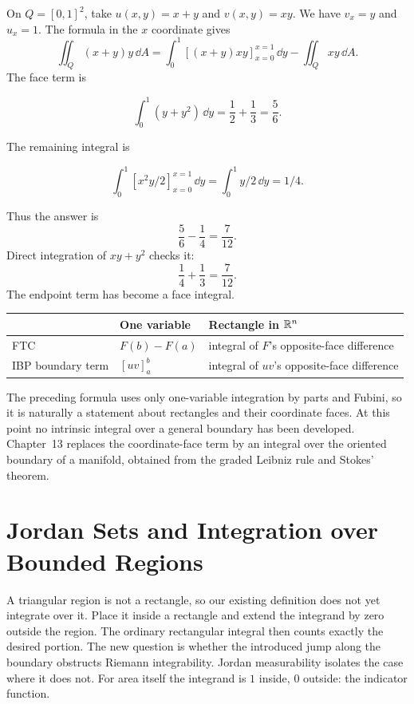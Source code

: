 \begin{example}
On $Q=[0,1]^2$, take $u(x,y)=x+y$ and $v(x,y)=xy$.
We have $v_x=y$ and $u_x=1$. The formula in the $x$ coordinate gives
\[
\iint_Q(x+y)y\,\dd A
=\int_0^1[(x+y)xy]_{x=0}^{x=1}\,\dd y-\iint_Qxy\,\dd A.
\]
The face term is

\[
\int_0^1(y+y^2)\,\dd y=\frac12+\frac13=\frac56.
\]

The remaining integral is

\[
\int_0^1[ x^2y/2]_{x=0}^{x=1}\,\dd y=\int_0^1y/2\,\dd y=1/4.
\]

Thus the answer is
\[
\frac56-\frac14=\frac7{12}.
\]
 Direct integration of
$xy+y^2$ checks it:
\[
\frac14+\frac13=\frac7{12}.
\]
 The endpoint term has
become a face integral.
\end{example}
\begin{center}
\begin{tabular}{lll}
 & One variable & Rectangle in $\mathbb{R}^n$\\\hline
FTC & $F(b)-F(a)$ & integral of $F$'s opposite-face difference\\
IBP boundary term & $[uv]_a^b$ & integral of $uv$'s opposite-face difference
\end{tabular}
\end{center}
\begin{remark}
The preceding formula uses only one-variable integration by parts and Fubini,
so it is naturally a statement about rectangles and their coordinate faces.
At this point no intrinsic integral over a general boundary has been
developed.  Chapter~13 replaces the coordinate-face term by an integral over
the oriented boundary of a manifold, obtained from the graded Leibniz rule
and Stokes' theorem.
\end{remark}

\section{Jordan Sets and Integration over Bounded Regions}

A triangular region is not a rectangle, so our existing definition does
not yet integrate over it. Place it inside a rectangle and extend the
integrand by zero outside the region. The ordinary rectangular integral
then counts exactly the desired portion. The new question is whether the
introduced jump along the boundary obstructs Riemann integrability.
Jordan measurability isolates the case where it does not. For area itself
the integrand is $1$ inside, $0$ outside: the indicator function.

